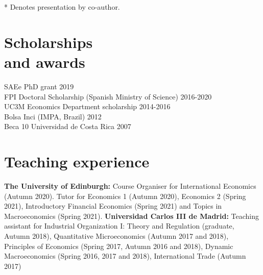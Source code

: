 \documentclass[margin]{res} %
\begin{document}
\begin{resume}
* Denotes presentation by co-author.


\section{Scholarships \\ and awards} 

SAEe PhD grant \hfill 2019\\
FPI Doctoral Scholarship (Spanish Ministry of Science) \hfill 2016-2020 \\
UC3M Economics Department scholarship \hfill 2014-2016 \\
Bolsa Inci (IMPA, Brazil) \hfill 2012 \\
Beca 10 Universidad de Costa Rica \hfill 2007


\section{Teaching experience}

{\bf The University of Edinburgh:} Course Organiser for International Economics (Autumn 2020). Tutor for Economics 1 (Autumn 2020), Economics 2 (Spring 2021), Introductory Financial Economics (Spring 2021) and Topics in Macroeconomics (Spring 2021).
{\bf Universidad Carlos III de Madrid:} Teaching assistant for Industrial Organization I: Theory and Regulation (graduate, Autumn 2018), Quantitative Microeconomics (Autumn 2017 and 2018), Principles of Economics (Spring 2017, Autumn 2016 and 2018), Dynamic Macroeconomics (Spring 2016, 2017 and 2018), International Trade (Autumn 2017)



\end{resume}
\end{document}
